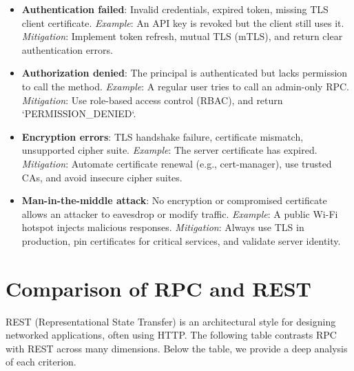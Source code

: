 \documentclass[10pt,a4paper]{article}
\begin{document}
\begin{itemize}
    \item \textbf{Authentication failed}: Invalid credentials, expired token, missing TLS client certificate.  
        \textit{Example}: An API key is revoked but the client still uses it.  
        \textit{Mitigation}: Implement token refresh, mutual TLS (mTLS), and return clear authentication errors.
    
    \item \textbf{Authorization denied}: The principal is authenticated but lacks permission to call the method.  
        \textit{Example}: A regular user tries to call an admin-only RPC.  
        \textit{Mitigation}: Use role-based access control (RBAC), and return `PERMISSION\_DENIED`.
    
    \item \textbf{Encryption errors}: TLS handshake failure, certificate mismatch, unsupported cipher suite.  
        \textit{Example}: The server certificate has expired.  
        \textit{Mitigation}: Automate certificate renewal (e.g., cert-manager), use trusted CAs, and avoid insecure cipher suites.
    
    \item \textbf{Man-in-the-middle attack}: No encryption or compromised certificate allows an attacker to eavesdrop or modify traffic.  
        \textit{Example}: A public Wi-Fi hotspot injects malicious responses.  
        \textit{Mitigation}: Always use TLS in production, pin certificates for critical services, and validate server identity.
\end{itemize}

\section{Comparison of RPC and REST}

REST (Representational State Transfer) is an architectural style for designing networked applications, often using HTTP. The following table contrasts RPC with REST across many dimensions. Below the table, we provide a deep analysis of each criterion.
\end{document}
